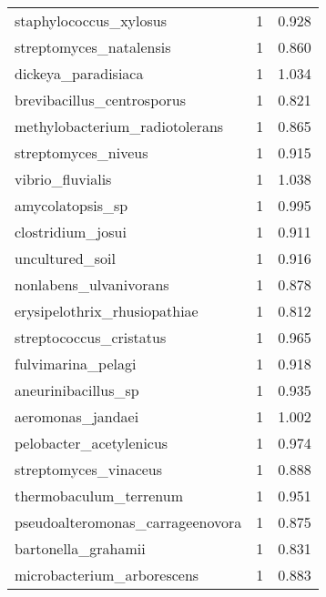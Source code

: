 \begin{tabular}{lrr}
                      staphylococcus\_xylosus &                   1 &     0.928 \\
                     streptomyces\_natalensis &                   1 &     0.860 \\
                         dickeya\_paradisiaca &                   1 &     1.034 \\
                  brevibacillus\_centrosporus &                   1 &     0.821 \\
              methylobacterium\_radiotolerans &                   1 &     0.865 \\
                         streptomyces\_niveus &                   1 &     0.915 \\
                            vibrio\_fluvialis &                   1 &     1.038 \\
                            amycolatopsis\_sp &                   1 &     0.995 \\
                           clostridium\_josui &                   1 &     0.911 \\
                             uncultured\_soil &                   1 &     0.916 \\
                      nonlabens\_ulvanivorans &                   1 &     0.878 \\
                erysipelothrix\_rhusiopathiae &                   1 &     0.812 \\
                     streptococcus\_cristatus &                   1 &     0.965 \\
                          fulvimarina\_pelagi &                   1 &     0.918 \\
                         aneurinibacillus\_sp &                   1 &     0.935 \\
                           aeromonas\_jandaei &                   1 &     1.002 \\
                     pelobacter\_acetylenicus &                   1 &     0.974 \\
                       streptomyces\_vinaceus &                   1 &     0.888 \\
                      thermobaculum\_terrenum &                   1 &     0.951 \\
            pseudoalteromonas\_carrageenovora &                   1 &     0.875 \\
                         bartonella\_grahamii &                   1 &     0.831 \\
                  microbacterium\_arborescens &                   1 &     0.883 \\

\end{tabular}
